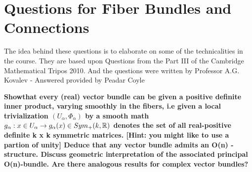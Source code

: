 \section{Questions for Fiber Bundles and Connections}
\begin{idea}
 The idea behind these questions is to elaborate on some of the technicalities in the course.
They are based upon Questions from the Part III of the Cambridge Mathematical Tripos 2010. And the questions were
written by Professor A.G. Kovalev
- Answered provided by Peadar Coyle
\end{idea}

 \textbf{Showthat every (real) vector bundle can be given a positive definite inner product, varying smoothly in the fibers, i.e
given a local trivialization $(U_\alpha, \Phi_\alpha)$ 
by a smooth math $g_{\alpha}: x \in U_\alpha \to g_\alpha(x) \in Sym_{+}(k,\mathbb{R})$ denotes the set of all real-positive definite k x k symmetric
matrices. [Hint: you might like to use a partion of unity]
Deduce that any vector bundle admits an O(n) - structure. Discuss geometric interpretation of the associated principal O(n)-bundle. Are
there analogous results for complex vector bundles?}


